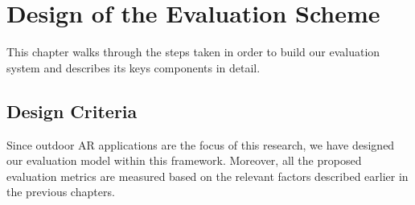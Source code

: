 \chapter{Design of the Evaluation Scheme}
\label{chap:System}

This chapter walks through the steps taken in order to build our evaluation system and describes its keys components in detail.

\section{Design Criteria}

Since outdoor AR applications are the focus of this research, we have designed our evaluation model within this framework. Moreover, all the proposed evaluation
metrics are measured based on the relevant factors described earlier in the previous chapters.







